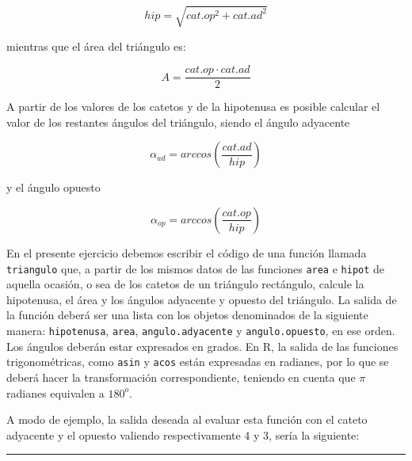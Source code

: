 \documentclass[]{article}
\newenvironment{Shaded}{}{}
\newcommand{\KeywordTok}[1]{\textcolor[rgb]{0.00,0.44,0.13}{\textbf{{#1}}}}
\newcommand{\DecValTok}[1]{\textcolor[rgb]{0.25,0.63,0.44}{{#1}}}
\newcommand{\FloatTok}[1]{\textcolor[rgb]{0.25,0.63,0.44}{{#1}}}
\newcommand{\NormalTok}[1]{{#1}}
\begin{document}
\[
hip = \sqrt{cat.op ^ 2 + cat.ad ^ 2}
\]

mientras que el área del triángulo es:

\[
A = \frac{cat.op \cdot cat.ad}{2}
\]

A partir de los valores de los catetos y de la hipotenusa es posible
calcular el valor de los restantes ángulos del triángulo, siendo el
ángulo adyacente

\[
\alpha_{ad} = arccos \left( \frac{cat.ad}{hip} \right)
\]

y el ángulo opuesto

\[
\alpha_{op} = arccos \left( \frac{cat.op}{hip} \right)
\]

En el presente ejercicio debemos escribir el código de una función
llamada \texttt{triangulo} que, a partir de los mismos datos de las
funciones \texttt{area} e \texttt{hipot} de aquella ocasión, o sea de
los catetos de un triángulo rectángulo, calcule la hipotenusa, el área y
los ángulos adyacente y opuesto del triángulo. La salida de la función
deberá ser una lista con los objetos denominados de la siguiente manera:
\texttt{hipotenusa}, \texttt{area}, \texttt{angulo.adyacente} y
\texttt{angulo.opuesto}, en ese orden. Los ángulos deberán estar
expresados en grados. En R, la salida de las funciones trigonométricas,
como \texttt{asin} y \texttt{acos} están expresadas en radianes, por lo
que se deberá hacer la transformación correspondiente, teniendo en
cuenta que $\pi$ radianes equivalen a $180^o$.

A modo de ejemplo, la salida deseada al evaluar esta función con el
cateto adyacente y el opuesto valiendo respectivamente 4 y 3, sería la
siguiente:

\begin{Shaded}
\end{Shaded}
\begin{center}\rule{3in}{0.4pt}\end{center}
\end{document}
